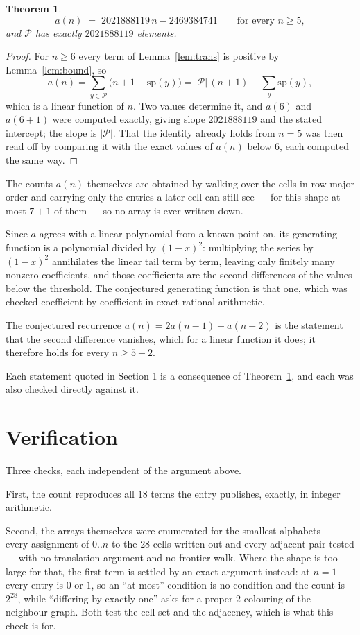 \documentclass[11pt,a4paper]{article}
\theoremstyle{plain}
\newtheorem{theorem}{Theorem}
\theoremstyle{definition}
\begin{document}
\begin{theorem}\label{thm:line}
\[
a(n)\;=\;2021888119\,n-2469384741\qquad\text{for every }n\ge5,
\]
and $\mathcal P$ has exactly $2021888119$ elements.
\end{theorem}

\begin{proof}
For $n\ge6$ every term of Lemma~\ref{lem:trans} is positive by
Lemma~\ref{lem:bound}, so
\[
a(n)=\sum_{y\in\mathcal P}\bigl(n+1-\mathrm{sp}(y)\bigr)
=|\mathcal P|\,(n+1)-\sum_{y}\mathrm{sp}(y),
\]
which is a linear function of $n$. Two values determine it, and $a(6)$ and
$a(6+1)$ were computed exactly, giving slope $2021888119$ and the stated intercept; the slope
is $|\mathcal P|$. That the identity already holds from $n=5$ was then read off by
comparing it with the exact values of $a(n)$ below $6$, each computed the same way.
\end{proof}

The counts $a(n)$ themselves are obtained by walking over the cells in row major order and
carrying only the entries a later cell can still see --- for this shape at most $7+1$ of
them --- so no array is ever written down.

Since $a$ agrees with a linear polynomial from a known point on, its generating function is a
polynomial divided by $(1-x)^2$: multiplying the series by $(1-x)^2$ annihilates the linear
tail term by term, leaving only finitely many nonzero coefficients, and those coefficients are
the second differences of the values below the threshold. The conjectured generating function
is that one, which was checked coefficient by coefficient in exact rational arithmetic.

The conjectured recurrence $a(n)=2a(n-1)-a(n-2)$ is the statement that the second difference
vanishes, which for a linear function it does; it therefore holds for every $n\ge5+2$.

Each statement quoted in Section 1 is a consequence of Theorem~\ref{thm:line}, and each was
also checked directly against it.

\section{Verification}

Three checks, each independent of the argument above.

First, the count reproduces all $18$ terms the entry publishes, exactly, in integer
arithmetic.

Second, the arrays themselves were enumerated for the smallest alphabets --- every assignment
of $0..n$ to the $28$ cells written out and every adjacent pair tested --- with no
translation argument and no frontier walk. Where the shape is too large for that, the first
term is settled by an exact argument instead: at $n=1$ every entry is $0$ or $1$, so an ``at
most'' condition is no condition and the count is $2^{28}$, while ``differing by exactly
one'' asks for a proper $2$-colouring of the neighbour graph. Both test the cell set and the
adjacency, which is what this check is for.
\end{document}
